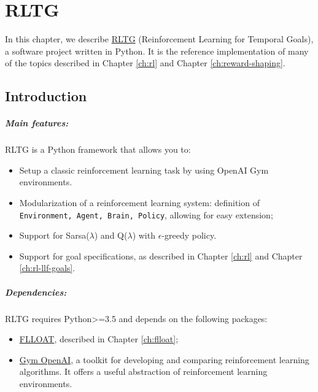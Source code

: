 \chapter{RLTG}\label{ch:rltg}
In this chapter, we describe \href{https://github.com/MarcoFavorito/rltg.git}{RLTG} (Reinforcement Learning for Temporal Goals), a software project written in Python.  It is the reference implementation of many of the topics described in Chapter \ref{ch:rl} and Chapter \ref{ch:reward-shaping}.

\section{Introduction}
\paragraph{Main features:} RLTG is a Python framework that allows you to:
\begin{itemize}

	\item Setup a classic reinforcement learning task by using OpenAI Gym environments.
	\item Modularization of a reinforcement learning system: definition of \texttt{Environment, Agent, Brain, Policy}, allowing for easy extension;
	\item Support for Sarsa($\lambda$) and Q($\lambda$) with $\epsilon$-greedy policy.
	\item Support for \LLf goal specifications, as described in Chapter \ref{ch:rl} and Chapter \ref{ch:rl-llf-goals}.

\end{itemize}

\paragraph{Dependencies:} RLTG requires Python>=3.5 and depends on the following packages:
\begin{itemize}
	\item \href{https://github.com/MarcoFavorito/flloat.git}{FLLOAT}, described in Chapter \ref{ch:flloat};
	\item \href{https://gym.openai.com/}{Gym OpenAI}, a toolkit for developing and comparing reinforcement learning algorithms. It offers a useful abstraction of reinforcement learning environments.
\end{itemize}

